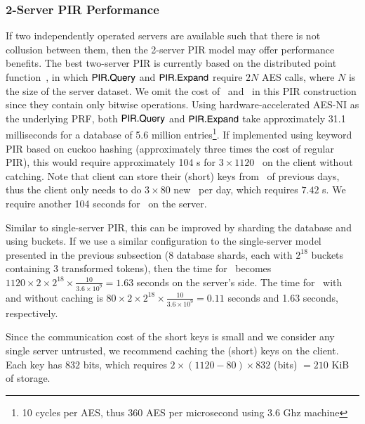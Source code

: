 {	
	\subsubsection{2-Server PIR Performance}
	\label{subs:2PIR}
	
	
	If two independently operated servers are available such that there is not collusion between them, then the 2-server PIR model may offer performance benefits. The best two-server PIR is currently based on the distributed point function~\cite{EC:BoyGilIsh15,CCS:BoyGilIsh16}, in which 
	$\textsf{PIR.Query}$ and  $\textsf{PIR.Expand}$ require $2N$ AES calls, where $N$ is the size of the server dataset. We omit the cost of \pirans\ and \pirextract\ in this PIR construction since they contain only bitwise operations. Using hardware-accelerated AES-NI as the underlying PRF, both $\textsf{PIR.Query}$ and  $\textsf{PIR.Expand}$ take approximately 31.1 milliseconds for a database of 5.6 million entries\footnote{10 cycles per AES, thus 360 AES per microsecond using 3.6 Ghz machine}. If implemented using keyword PIR based on cuckoo hashing (approximately three times the cost of regular PIR), this would require approximately 104 s for $3\times 1120$ \pirqe\ on the client without catching. Note that client can store their (short) keys from \pirqe\ of previous days, thus the client only needs to do $3\times 80$ new \pirqe\ per day, which requires $7.42$ s. We require another 104 seconds for \pirexpand\ on the server. %
	
	Similar to single-server PIR, this can be improved by sharding the database and using buckets. If we use a similar configuration to the single-server model presented in the previous subsection (8 database shards, each with $2^{18}$ buckets containing 3 transformed tokens), then the time for \pirexpand\ becomes $1120 \times 2 \times 2^{18} \times \frac{10}{3.6\times10^9} =1.63$ seconds on the server's side. The time for \pirqe\ with and without caching is $80 \times 2 \times 2^{18} \times \frac{10}{3.6\times10^9} = 0.11$ seconds and 1.63 seconds, respectively. 
	
	Since the communication cost of the short keys is small and we consider any single server untrusted, we recommend caching the (short) keys on the client. Each key has $832$ bits, which requires $2 \times (1120-80) \times 832$ (bits) $= 210$ KiB of storage.
	
	
}
